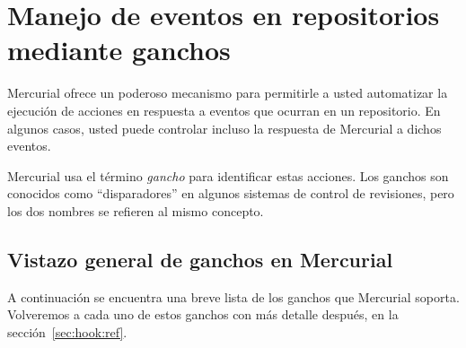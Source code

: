 \chapter{Manejo de eventos en repositorios mediante ganchos}
\label{chap:hook}

Mercurial ofrece un poderoso mecanismo para permitirle a usted
automatizar la ejecución de acciones en respuesta a eventos que
ocurran en un repositorio. En algunos casos, usted puede controlar
incluso la respuesta de Mercurial a dichos eventos.

Mercurial usa el término \emph{gancho} para identificar estas
acciones. Los ganchos son conocidos como ``disparadores'' en algunos
sistemas de control de revisiones, pero los dos nombres se refieren al
mismo concepto.

\section{Vistazo general de ganchos en Mercurial}

A continuación se encuentra una breve lista de los ganchos que
Mercurial soporta. Volveremos a cada uno de estos ganchos con más
detalle después, en la sección~\ref{sec:hook:ref}.

